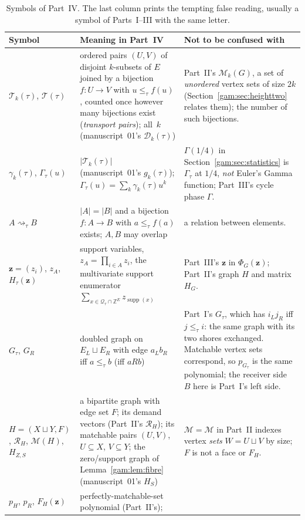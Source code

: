 \documentclass[11pt]{article}
\numberwithin{equation}{section}
\theoremstyle{definition}
\newcommand{\Z}{\mathbb Z}
\newcommand{\Qt}{\mathcal Q_\tau}
\newcommand{\supp}{\operatorname{supp}}
\newcommand{\PM}{\mathcal M}
\newcommand{\zv}{\mathbf z}
\newcommand{\Tset}{\mathcal T}
\newcommand{\match}{\rightsquigarrow}
\begin{document}
\begin{table}[p]
\centering\footnotesize
\caption{Symbols of Part~IV. The last column prints the tempting false
reading, usually a symbol of Parts~I--III with the same letter.}
\label{gam:tab:notation}
\begin{tabularx}{\textwidth}{@{}>{\raggedright}p{}>{\raggedright}p{}Y@{}}
\toprule
Symbol & Meaning in Part~IV & Not to be confused with\\
\midrule
$\Tset_k(\tau)$, $\Tset(\tau)$ & ordered pairs $(U,V)$ of disjoint
 $k$-subsets of $E$ joined by a bijection $f:U\to V$ with $u\le_\tau f(u)$,
 counted once however many bijections exist (\emph{transport pairs});
 all~$k$ (manuscript~01's $\mathcal D_k(\tau)$) & Part~II's $\PM_k(G)$, a set
 of \emph{unordered} vertex sets of size $2k$ (Section~\ref{gam:sec:heighttwo}
 relates them); the number of such bijections.\\
$\gamma_k(\tau)$, $\Gamma_\tau(u)$ & $|\Tset_k(\tau)|$ (manuscript~01's
 $g_k(\tau)$); $\Gamma_\tau(u)=\sum_k\gamma_k(\tau)u^k$ &
 $\Gamma(1/4)$ in Section~\ref{gam:sec:statistics} is $\Gamma_\tau$ at $1/4$,
 \emph{not} Euler's Gamma function; Part~III's cycle phase $\Gamma$.\\
$A\match_\tau B$ & $|A|=|B|$ and a bijection $f:A\to B$ with
 $a\le_\tau f(a)$ exists; $A,B$ may overlap & a relation between elements.\\
$\zv=(z_i)$, $z_A$, $H_\tau(\zv)$ & support variables, $z_A=\prod_{i\in A}z_i$,
 the multivariate support enumerator $\sum_{x\in\Qt\cap\Z^E}z_{\supp(x)}$ &
 Part~III's $\zv$ in $\Phi_G(\zv)$; Part~II's graph $H$ and matrix $H_G$.\\
$G_\tau$, $G_R$ & doubled graph on $E_L\sqcup E_R$ with edge $a_Lb_R$ iff
 $a\le_\tau b$ (iff $aRb$) & Part~I's $G_\tau$, which has $i_Lj_R$ iff
 $j\le_\tau i$: the same graph with its two shores exchanged. Matchable vertex
 sets correspond, so $p_{G_\tau}$ is the same polynomial; the receiver
 side~$B$ here is Part~I's left side.\\
$H=(X\sqcup Y,F)$, $\mathcal R_H$, $\mathcal M(H)$, $H_{Z,S}$ & a bipartite
 graph with edge set $F$; its demand vectors (Part~II's $\mathcal R_H$);
 its matchable pairs $(U,V)$, $U\subseteq X$, $V\subseteq Y$; the zero/support
 graph of Lemma~\ref{gam:lem:fibre} (manuscript~01's $H_S$) &
 $\mathcal M=\PM$ in Part~II indexes vertex \emph{sets} $W=U\sqcup V$ by size;
 $F$ is not a face or $F_H$.\\
$p_H$, $p_R$, $F_H(\zv)$ & perfectly-matchable-set polynomial (Part~II's);

\end{tabularx}
\end{table}
\end{document}
